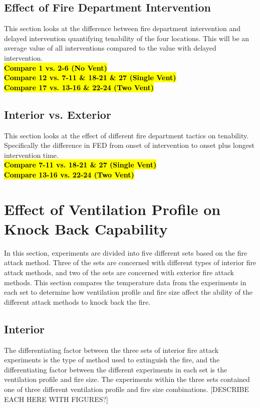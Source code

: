 \documentclass[12pt,oneside]{book}
\begin{document}
\clearpage

\subsection{Effect of Fire Department Intervention}
This section looks at the difference between fire department intervention and delayed intervention quantifying tenability of the four locations. This will be an average value of all interventions compared to the value with delayed intervention. \\
\textbf{\hl{Compare 1 vs. 2-6 (No Vent)}} \\
\textbf{\hl{Compare 12 vs. 7-11 \& 18-21 \& 27 (Single Vent)}} \\
\textbf{\hl{Compare 17 vs. 13-16 \& 22-24 (Two Vent)}} \\

\subsection{Interior vs. Exterior}
This section looks at the effect of different fire department tactics on tenability. Specifically the difference in FED from onset of intervention to onset plus longest intervention time. \\
\textbf{\hl{Compare 7-11 vs. 18-21 \& 27 (Single Vent)}} \\
\textbf{\hl{Compare 13-16 vs. 22-24 (Two Vent)}} \\

\section{Effect of Ventilation Profile on Knock Back Capability}
In this section, experiments are divided into five different sets based on the fire attack method. Three of the sets are concerned with different types of interior fire attack methods, and two of the sets are concerned with exterior fire attack methods. This section compares the temperature data from the experiments in each set to determine how ventilation profile and fire size affect the ability of the different attack methods to knock back the fire. 

\subsection{Interior}
The differentiating factor between the three sets of interior fire attack experiments is the type of method used to extinguish the fire, and the differentiating factor between the different experiments in each set is the ventilation profile and fire size. The experiments within the three sets contained one of three different ventilation profile and fire size combinations. [DESCRIBE EACH HERE WITH FIGURES?] 
\end{document}
